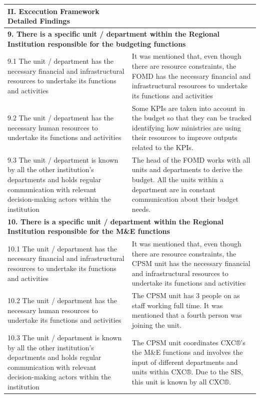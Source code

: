 \documentclass[
  10pt,
]{book}
\begin{document}
\begin{table}
\centering
\begin{tabular}[t]{l|l}
\hline
II. Excecution Framework Detailed Findings &  \\
\hline
\multicolumn{2}{l}{\textbf{9. There is a specific unit / department within the Regional Institution responsible for the budgeting functions}}\\
\hline
\hspace{1em}9.1 The unit / department has the necessary financial and infrastructural resources to undertake its functions and activities & It was mentioned that, even though there are resource constraints, the FOMD has the  necessary financial and infrastructural resources to undertake its functions and activities\\
\hline
\hspace{1em}9.2 The unit / department has the necessary human resources to undertake its functions and activities & Some KPIs are taken into account in the budget so that they can be tracked identifying how ministries are using their resources to improve outputs related to the KPIs.\\
\hline
\hspace{1em}9.3 The unit / department is known by all the other institution's departments and holds regular communication with relevant decision-making actors within the institution & The head of the FOMD works with all units and departments to derive the budget. All the units within a department are in constant communication about their budget needs.\\
\hline
\multicolumn{2}{l}{\textbf{10. There is a specific unit / department within the Regional Institution responsible for the M\&E functions}}\\
\hline
\hspace{1em}10.1 The unit / department has the necessary financial and infrastructural resources to undertake its functions and activities & It was mentioned that, even though there are resource constraints, the CPSM unit has the  necessary financial and infrastructural resources to undertake its functions and activities\\
\hline
\hspace{1em}10.2 The unit / department has the necessary human resources to undertake its functions and activities & The CPSM unit has 3 people on as staff working full time. It was mentioned that a fourth person was joining the unit.\\
\hline
\hspace{1em}10.3 The unit / department is known by all the other institution's departments and holds regular communication with relevant decision-making actors within the institution & The CPSM unit coordinates CXC®’s the M\&E functions and involves the input of different departments and units within CXC®. Due to the SIS, this unit is known by all CXC®.\\

\end{tabular}
\end{table}
\end{document}
